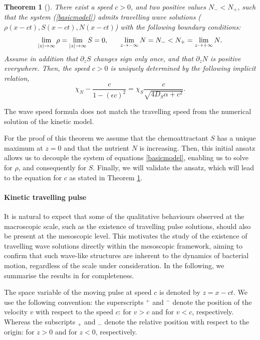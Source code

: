 \documentclass[11pt,twoside]{article}
\numberwithin{equation}{section}
\theoremstyle{plain}
\newtheorem{theorem}{Theorem}[section]
\theoremstyle{nonumberplain}
\begin{document}
\begin{theorem}[\cite{calvez2016chemotactic}]\label{thmacro}
There exist a speed $c>0$, and two positive values $N_- < N_+$, such that the system (\ref{basicmodel}) admits travelling wave solutions ($\rho (x- c t), S(x - c t), N(x - c t)$) with the following boundary conditions:
\begin{equation}
    \lim_{|z| \to \infty} \rho = \lim_{|z| \to \infty} S = 0, \hspace{0.6cm} \lim_{z \to -\infty} N = N_- < N_+ = \lim_{z \to + \infty} N.
    \nonumber
\end{equation}
Assume in addition that $\partial_z S$ changes sign only once, and that $\partial_z N$ is positive everywhere. Then, the speed $c > 0$ is uniquely determined by the following implicit relation,
\[
\chi_N - \frac{c}{1 - (\epsilon c)^2} = \chi_S \frac{c}{\sqrt{4 D_S \alpha + c^2}}.
\]
\end{theorem}
{\color{red} The wave speed formula does not match the travelling speed from the numerical solution of the kinetic model.}

For the proof of this theorem we assume that the chemoattractant $S$ has a unique maximum at $z = 0$ and that the nutrient $N$ is increasing. Then, this initial ansatz allows us to decouple the system of equations \eqref{basicmodel}, enabling us to solve for $\rho$, and consequently for $S$. Finally, we will validate the ansatz, which will lead to the equation for $c$ as stated in Theorem \ref{thmacro}.

\paragraph{Kinetic travelling pulse} It is natural to expect that some of the qualitative behaviours observed at the macroscopic scale, such as the existence of travelling pulse solutions, should also be present at the mesoscopic level. This motivates the study of the existence of travelling wave solutions directly within the mesoscopic framework, aiming to confirm that such wave-like structures are inherent to the dynamics of bacterial motion, regardless of the scale under consideration.
In the following, we summarise the results in \cite{calvez2016chemotactic} for completeness.

The space variable of the moving pulse at speed $c$ is denoted by $z = x-ct$.
We use the following convention: the superscripts $^+$ and $^-$ denote the position of the velocity $v$ with respect to the speed $c$: for $v>c$ and for $v<c$, respectively. Whereas the subscripts $_+$ and $_-$ denote the relative position with respect to the origin: for $z>0$ and for $z<0$, respectively. 
\end{document}
